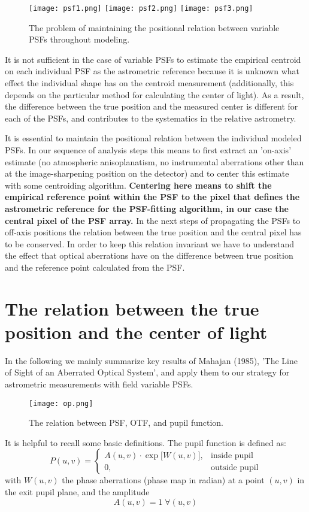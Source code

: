 \documentclass[a4paper]{article}
\begin{document}
\begin{figure}[h!]
\centering
\texttt{[image: psf1.png]}
\texttt{[image: psf2.png]}
\texttt{[image: psf3.png]}
\caption{\label{fig:frog}The problem of maintaining the positional relation between variable PSFs throughout modeling.}
\end{figure}

It is not sufficient in the case of variable PSFs to estimate the empirical centroid on each individual PSF as the astrometric reference because it is unknown what effect the individual shape has on the centroid measurement (additionally, this depends on the particular method for calculating the center of light). As a result, the difference between the true position and the measured center is different for each of the PSFs, and contributes to the systematics in the relative astrometry.

It is essential to maintain the positional relation between the individual modeled PSFs. In our sequence of analysis steps this means to first extract an 'on-axis' estimate (no atmospheric anisoplanatism, no instrumental aberrations other than at the image-sharpening position on the detector) and to center this estimate with some centroiding algorithm. {\bf Centering here means to shift the empirical reference point within the PSF to the pixel that defines the astrometric reference for the PSF-fitting algorithm, in our case the central pixel of the PSF array.} In the next steps of propagating the PSFs to off-axis positions the relation between the true position and the central pixel has to be conserved. In order to keep this relation invariant we have to understand the effect that optical aberrations have on the difference between true position and the reference point calculated from the PSF.  

\section{The relation between the true position and the center of light}

In the following we mainly summarize key results of Mahajan (1985), 'The Line of Sight of an Aberrated Optical System', and apply them to our strategy for astrometric measurements with field variable PSFs.
\begin{figure}[h!]
\centering
\texttt{[image: op.png]}
\caption{\label{fig:op}The relation between PSF, OTF, and pupil function.}
\end{figure}
It is helpful to recall some basic definitions. The pupil function is defined as:
\begin{equation}
P(u,v) = \left\{\begin{array}{cl} A(u,v) \cdot \exp\big[W(u,v)\big], & \mbox{inside pupil}\\ 
0, & \mbox{outside pupil} \end{array}\right.
\end{equation}
with $W(u,v)$ the phase aberrations (phase map in radian) at a point $(u,v)$ in the exit pupil plane, and the amplitude
\begin{equation}\label{amp}
A(u,v) = 1 \; \forall (u,v)
\end{equation}
\end{document}
